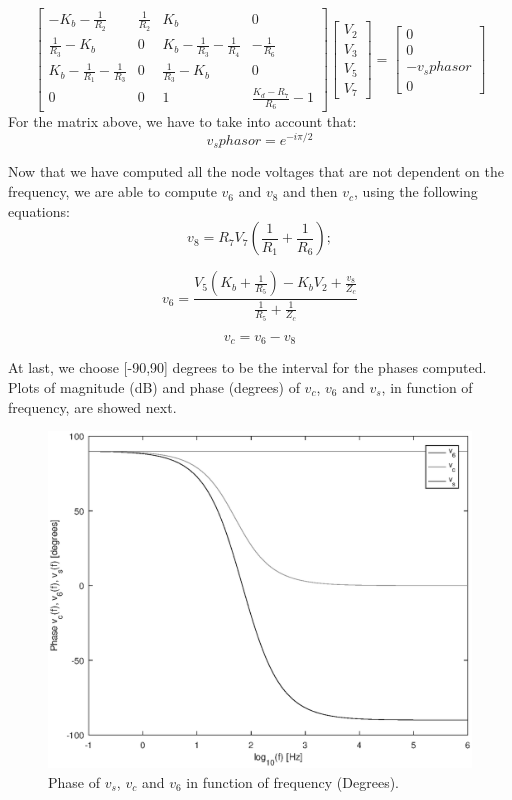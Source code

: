$$ \left[ \begin{array}{cccc} - K_b -\frac{1}{R_2}  & \frac{1}{R_2} & K_b & 0 \\
\frac{1}{R_3} - K_b & 0 & K_b -\frac{1}{R_3}-\frac{1}{R_4} & -\frac{1}{R_6} \\
K_b-\frac{1}{R_1}-\frac{1}{R_3} & 0 & \frac{1}{R_3}-K_b & 0 
\\ 0 & 0 & 1 & \frac{K_d - R_7}{R_6}-1\end{array} \right]
\left[ \begin{array}{c} V_2 \\ V_3 \\ V_5 \\ V_7 \end{array} \right] = 
\left[ \begin{array}{c} 0 \\ 0 \\ -v_sphasor \\ 0 \end{array} \right] $$
For the matrix above, we have to take into account that:
\begin{equation}
v_sphasor = e^{-i\pi/2}
\label{eq:vsphasor}
\end{equation}

\noindent Now that we have computed all the node voltages that are not dependent on the frequency, 
we are able to compute $v_6$ and $v_8$ and then $v_c$, using the following equations:
\begin{equation}
v_8 = R_7V_7(\frac{1}{R_1} + \frac{1}{R_6});
\label{eq:V_8}
\end{equation}

\begin{equation}
v_6 = \frac{V_5(K_b + \frac{1}{R_5}) - K_bV_2 + \frac{v_8}{Z_c}}{\frac{1}{R_5} + \frac{1}{Z_c}} 
\label{eq:V_6}
\end{equation}

\begin{equation}
v_c = v_6 - v_8
\label{eq:V_c}
\end{equation}

\noindent At last, we choose [-90,90] degrees to be the interval for the phases computed. 
Plots of magnitude (dB) and phase (degrees) of $v_c$, $v_6$ and $v_s$, in function of frequency, are showed next.
\begin{figure}[h!] \centering
\includegraphics[width=0.7\linewidth]{Phase(degrees).eps}
\caption{Phase of $v_s$, $v_c$ and $v_6$ in function of frequency (Degrees).}
\label{fig:phase}
\end{figure}

